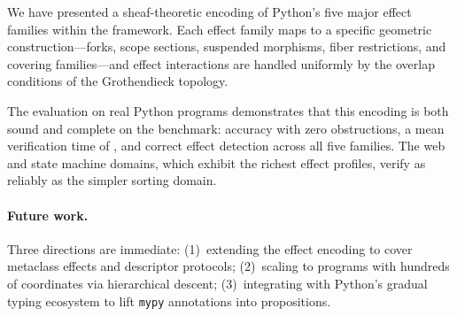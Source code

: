 \documentclass[11pt]{article}
\begin{document}
We have presented a sheaf-theoretic encoding of Python's five major
effect families within the \JuGeo{} framework.  Each effect family
maps to a specific geometric construction---forks, scope sections,
suspended morphisms, fiber restrictions, and covering families---and
effect interactions are handled uniformly by the overlap conditions
of the Grothendieck topology.

The evaluation on \expTotalPrograms{} real Python programs demonstrates
that this encoding is both sound and complete on the benchmark:
\expAccuracy{} accuracy with zero obstructions, a mean verification
time of \expTimeMean{}, and correct effect detection across all five
families.  The web and state machine domains, which exhibit the richest
effect profiles, verify as reliably as the simpler sorting domain.

\paragraph{Future work.}
Three directions are immediate: (1)~extending the effect encoding to
cover metaclass effects and descriptor protocols; (2)~scaling to
programs with hundreds of coordinates via hierarchical descent;
(3)~integrating with Python's gradual typing ecosystem to lift
\texttt{mypy} annotations into propositions.
\end{document}
